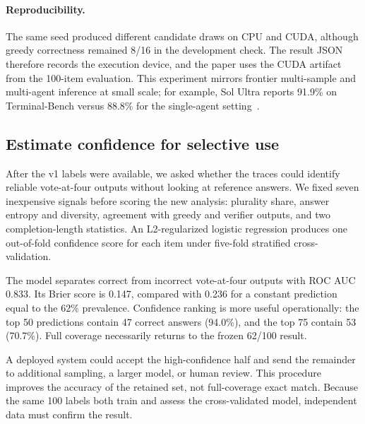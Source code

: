 \paragraph{Reproducibility.} The same seed produced different candidate
draws on CPU and CUDA, although greedy correctness remained 8/16 in the
development check. The result JSON therefore records the execution device, and
the paper uses the CUDA artifact from the 100-item evaluation. This experiment
mirrors frontier multi-sample and multi-agent inference at small scale; for
example, Sol Ultra reports 91.9\% on Terminal-Bench versus 88.8\% for the
single-agent setting~\cite{openai2026gpt56}.

\subsection{Estimate confidence for selective use}\label{sec:confidence}

After the v1 labels were available, we asked whether the traces could identify
reliable vote-at-four outputs without looking at reference answers. We fixed
seven inexpensive signals before scoring the new analysis: plurality share,
answer entropy and diversity, agreement with greedy and verifier outputs, and
two completion-length statistics. An L2-regularized logistic regression
produces one out-of-fold confidence score for each item under five-fold
stratified cross-validation.

The model separates correct from incorrect vote-at-four outputs with ROC AUC
0.833. Its Brier score is 0.147, compared with 0.236 for a constant prediction
equal to the 62\% prevalence. Confidence ranking is more useful operationally:
the top 50 predictions contain 47 correct answers (94.0\%), and the top 75
contain 53 (70.7\%). Full coverage necessarily returns to the frozen 62/100
result.

\begin{table}[H]
\centering
\caption{Exploratory selective accuracy from five-fold out-of-fold confidence
scores. Coverage levels were fixed before scoring. Top refers to confidence
rank, not a second evaluation split.}\label{tab:mlconfidence}
\small

\end{table}

A deployed system could accept the high-confidence half and send the remainder
to additional sampling, a larger model, or human review. This procedure
improves the accuracy of the retained set, not full-coverage exact match.
Because the same 100 labels both train and assess the cross-validated model,
independent data must confirm the result.

